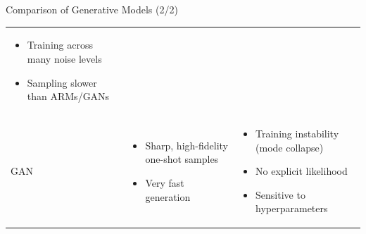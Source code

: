 \documentclass[xcolor=dvipsnames,aspectratio=169]{beamer}
\begin{document}
\begin{frame}{Comparison of Generative Models (2/2)}
\begin{tabularx}{\linewidth}{@{} l X X @{}}
                \begin{itemize}\item Training across many noise levels \item Sampling slower than ARMs/GANs \end{itemize} \\
                GAN &
                \begin{itemize}\item Sharp, high-fidelity one-shot samples \item Very fast generation \end{itemize} &
                \begin{itemize}\item Training instability (mode collapse) \item No explicit likelihood \item Sensitive to hyperparameters \end{itemize} \\
                \bottomrule
            \end{tabularx}
        \end{frame}
\end{document}
